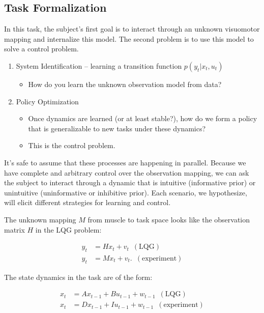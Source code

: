 \documentclass[
  a4paper,
]{article}
\providecommand{\tightlist}{%
  \setlength{\itemsep}{0pt}\setlength{\parskip}{0pt}}
\begin{document}
\hypertarget{task-formalization}{%
\subsection{Task Formalization}\label{task-formalization}}

In this task, the subject's first goal is to interact through an unknown
visuomotor mapping and internalize this model. The second problem is to
use this model to solve a control problem.

\begin{enumerate}
\def\labelenumi{\arabic{enumi}.}
\tightlist
\item
  System Identification -- learning a transition function
  \(p(y_t|x_t, u_t)\)

  \begin{itemize}
  \tightlist
  \item
    How do you learn the unknown observation model from data?
  \end{itemize}
\item
  Policy Optimization

  \begin{itemize}
  \tightlist
  \item
    Once dynamics are learned (or at least stable?), how do we form a
    policy that is generalizable to new tasks under these dynamics?
  \item
    This is the control problem.
  \end{itemize}
\end{enumerate}

It's safe to assume that these processes are happening in parallel.
Because we have complete and arbitrary control over the observation
mapping, we can ask the subject to interact through a dynamic that is
intuitive (informative prior) or unintuitive (uninformative or
inhibitive prior). Each scenario, we hypothesize, will elicit different
strategies for learning and control.

The unknown mapping \(M\) from muscle to task space looks like the
observation matrix \(H\) in the LQG problem:

\[
\begin{align*}
y_t &= Hx_t + v_t\,\,\,(\mathrm{LQG}) \\
y_t &= Mx_t + v_t. \,\,\,(\mathrm{experiment})
\end{align*}
\]

The state dynamics in the task are of the form:

\[
\begin{align*}
x_{t} &= Ax_{t-1} + Bu_{t-1} + w_{t-1} \,\,\,(\mathrm{LQG}) \\
x_t &= Dx_{t-1} + Iu_{t-1} + w_{t-1} \,\,\,(\mathrm{experiment})
\end{align*}
\]
\end{document}
